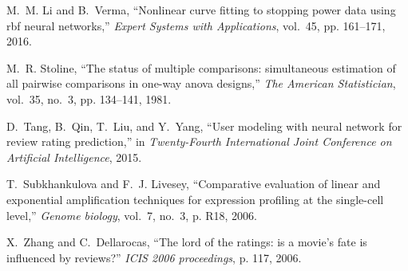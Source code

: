 \documentclass{mcmthesis}
\begin{document}
\begin{thebibliography}{99}

M.~M. Li and B.~Verma, ``Nonlinear curve fitting to stopping power data using
  rbf neural networks,'' \emph{Expert Systems with Applications}, vol.~45, pp.
  161--171, 2016.
  
  
M.~R. Stoline, ``The status of multiple comparisons: simultaneous estimation of
  all pairwise comparisons in one-way anova designs,'' \emph{The American
  Statistician}, vol.~35, no.~3, pp. 134--141, 1981.

D.~Tang, B.~Qin, T.~Liu, and Y.~Yang, ``User modeling with neural network for
  review rating prediction,'' in \emph{Twenty-Fourth International Joint
  Conference on Artificial Intelligence}, 2015.
  
T.~Subkhankulova and F.~J. Livesey, ``Comparative evaluation of linear and
  exponential amplification techniques for expression profiling at the
  single-cell level,'' \emph{Genome biology}, vol.~7, no.~3, p. R18, 2006. 

X.~Zhang and C.~Dellarocas, ``The lord of the ratings: is a movie's fate is
  influenced by reviews?'' \emph{ICIS 2006 proceedings}, p. 117, 2006.
  

\end{thebibliography}
\end{document}
